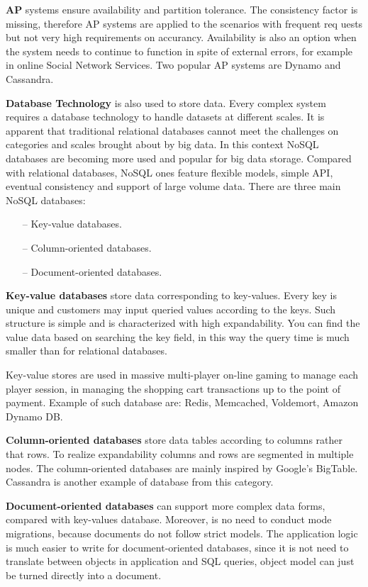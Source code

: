 \textbf{AP} systems ensure availability and partition tolerance. The consistency factor is missing, therefore AP systems are applied to the scenarios with frequent req
uests but not very high requirements on accurancy. Availability is also an option when the system needs to continue to function in spite of external errors, \cite{AP} for example in online Social Network Services. Two popular AP systems are Dynamo and Cassandra. 

\textbf{Database Technology} is also used to store data. Every complex system requires a database technology to handle datasets at different scales. It is apparent that traditional relational databases cannot meet the challenges on categories and scales brought about by big data. In this context NoSQL databases are becoming more used and popular for big data storage. Compared with relational databases, NoSQL ones feature flexible models, simple API, eventual consistency and support of large volume data. There are three main NoSQL databases:
 
\begin{itemize}
\item[--] Key-value databases.
\item[--] Column-oriented databases.
\item[--] Document-oriented databases.
\end{itemize} 

\textbf{Key-value databases} store data corresponding to key-values. Every key is unique and customers may input queried values according to the keys. Such structure is simple and is characterized with high expandability. You can find the value data based on searching the key field, in this way the query time is much smaller than for relational databases.

Key-value stores are used in massive multi-player on-line gaming to manage each player session, in managing the shopping cart transactions up to the point of payment. Example of such database are: Redis, Memcached, Voldemort, Amazon Dynamo DB.

\textbf{Column-oriented databases} store data tables according to columns rather that rows. To realize expandability columns and rows are segmented in multiple nodes. The column-oriented databases are mainly inspired by Google's BigTable. Cassandra is another example of database from this category.

\textbf{Document-oriented databases} can support more complex data forms, compared with key-values database. Moreover, is no need to conduct mode migrations, because documents do not follow strict models. The application logic is much easier to write for document-oriented databases, since it is not need to translate between objects in application and SQL queries, object model can just be turned directly into a document.

